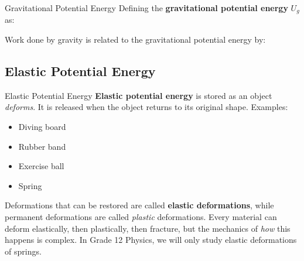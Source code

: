 \documentclass[12pt,compress,aspectratio=169]{beamer}
\begin{document}
\begin{frame}{Gravitational Potential Energy}
  Defining the \textbf{gravitational potential energy} $U_g$ as:


  \vspace{-.1in}Work done by gravity is related to the gravitational potential
  energy by:
  

\end{frame}


\subsection{Elastic Potential Energy}

\begin{frame}{Elastic Potential Energy}
  \textbf{Elastic potential energy} is stored as an object \emph{deforms}. It
  is released when the object returns to its original shape. Examples:
  \begin{itemize}
  \item Diving board
  \item Rubber band
  \item Exercise ball
  \item Spring
  \end{itemize}
  Deformations that can be restored are called \textbf{elastic deformations},
  while permanent deformations are called \emph{plastic} deformations. Every
  material can deform elastically, then plastically, then fracture, but the
  mechanics of \emph{how} this happens is complex. In Grade 12 Physics, we will
  only study elastic deformations of springs.
\end{frame}
\end{document}

